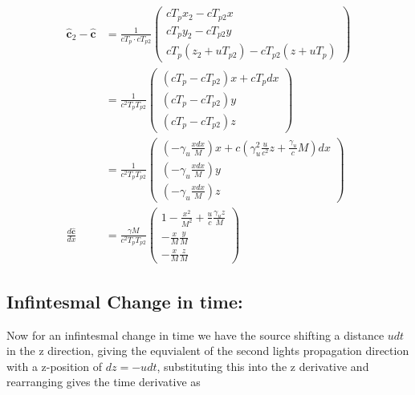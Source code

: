 \begin{equation}
	\begin{aligned}
	\mathbf{\hat{c}}_2 - \mathbf{\hat{c}} &= \frac{1}{c T_{p} \cdot c T_{p2}}
	\begin{pmatrix}
		c T_{p} x_2 - c T_{p2} x\\
		c T_{p} y_2 - c T_{p2} y\\
		c T_{p} (z_2 + u T_{p2}) - c T_{p2} (z + u T_{p})
	\end{pmatrix} \\
	&=
	\frac{1}{c^2 T_{p} T_{p2}}
	\begin{pmatrix}
		(c T_{p} - c T_{p2}) x + c T_{p} dx \\
		(c T_{p} - c T_{p2}) y \\
		(c T_{p} - c T_{p2}) z
	\end{pmatrix} \\
	&=
	\frac{1}{c^2 T_{p} T_{p2}}
	\begin{pmatrix}
		(- \gamma_u \frac{xdx}{M}) x + c (\gamma_u^2 \frac{u}{c^2}z + \frac{\gamma_u}{c} M) dx \\
		(- \gamma_u \frac{xdx}{M}) y \\
		(- \gamma_u \frac{xdx}{M}) z
	\end{pmatrix} \\
	\frac{d\mathbf{\hat{c}}}{dx} &=
	\frac{\gamma M}{c^2 T_{p} T_{p2}}
	\begin{pmatrix}
		1 - \frac{x^2}{M^2} + \frac{u}{c}\frac{\gamma_u z}{M} \\
		- \frac{x}{M} \frac{y}{M} \\
		- \frac{x}{M} \frac{z}{M}
	\end{pmatrix}
\end{aligned}
\end{equation}


\subsection{Infintesmal Change in time:}

Now for an infintesmal change in time we have the source shifting a distance $u dt$ in the z direction, giving the equvialent of the second lights propagation direction with a z-position of $ dz = - u dt$, substituting this into the z derivative and rearranging gives the time derivative as


